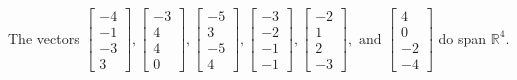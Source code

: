 \begin{exercise}
\begin{exerciseStatement}
  \end{exerciseStatement}
  \begin{exerciseAnswer}
   The vectors \(\left[\begin{array}{r}
-4 \\
-1 \\
-3 \\
3
\end{array}\right] , \left[\begin{array}{r}
-3 \\
4 \\
4 \\
0
\end{array}\right] , \left[\begin{array}{r}
-5 \\
3 \\
-5 \\
4
\end{array}\right] , \left[\begin{array}{r}
-3 \\
-2 \\
-1 \\
-1
\end{array}\right] , \left[\begin{array}{r}
-2 \\
1 \\
2 \\
-3
\end{array}\right] , \text{ and } \left[\begin{array}{r}
4 \\
0 \\
-2 \\
-4
\end{array}\right]\) 
  	 do  
	span \(\mathbb{R}^4\).
  


  \end{exerciseAnswer}
\end{exercise}